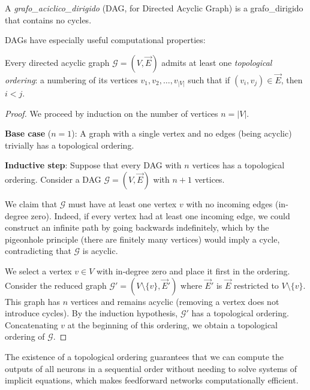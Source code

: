 \begin{definition}\label{def:dag}
A \textit{\gls{grafo_aciclico_dirigido}} (DAG, for Directed Acyclic Graph) is a \gls{grafo_dirigido} that contains no cycles.
\end{definition}

\glspl{DAG} have especially useful computational properties:

\begin{theorem}\label{thm:ordenamiento_topologico}
Every directed acyclic graph $\mathcal{G} = (V, \vec{E})$ admits at least one \textit{topological ordering}: a numbering of its vertices $v_1, v_2, \ldots, v_{|V|}$ such that if $(v_i, v_j) \in \vec{E}$, then $i < j$.
\end{theorem}

\begin{proof}
We proceed by induction on the number of vertices $n = |V|$.

\textbf{Base case} ($n = 1$): A graph with a single vertex and no edges (being acyclic) trivially has a topological ordering.

\textbf{Inductive step}: Suppose that every \gls{DAG} with $n$ vertices has a topological ordering. Consider a \gls{DAG} $\mathcal{G} = (V, \vec{E})$ with $n+1$ vertices.

We claim that $\mathcal{G}$ must have at least one vertex $v$ with no incoming edges (in-degree zero). Indeed, if every vertex had at least one incoming edge, we could construct an infinite path by going backwards indefinitely, which by the pigeonhole principle (there are finitely many vertices) would imply a cycle, contradicting that $\mathcal{G}$ is acyclic.

We select a vertex $v \in V$ with in-degree zero and place it first in the ordering. Consider the reduced graph $\mathcal{G}' = (V \setminus \{v\}, \vec{E}')$ where $\vec{E}'$ is $\vec{E}$ restricted to $V \setminus \{v\}$. This graph has $n$ vertices and remains acyclic (removing a vertex does not introduce cycles). By the induction hypothesis, $\mathcal{G}'$ has a topological ordering. Concatenating $v$ at the beginning of this ordering, we obtain a topological ordering of $\mathcal{G}$.
\end{proof}

The existence of a topological ordering guarantees that we can compute the outputs of all neurons in a sequential order without needing to solve systems of implicit equations, which makes feedforward networks computationally efficient.

